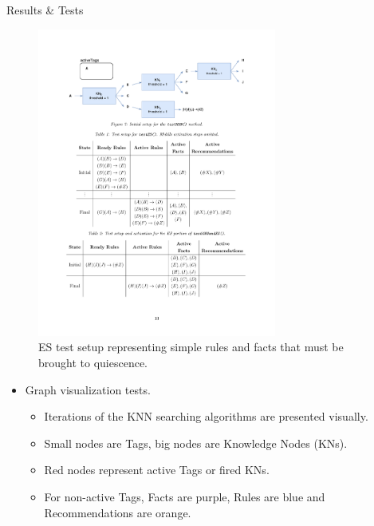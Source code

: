 \documentclass[final]{beamer} %
\begin{document}
\begin{frame}
\begin{columns}
\begin{column}{.33\textwidth}
{\begin{block}{Results \& Tests}
					\begin{figure}[!htb]
						\centering
						\includegraphics[width=0.7\textwidth]{figures/testES.pdf}
						\caption
						{ES test setup representing simple rules and facts that must be brought to quiescence.}
					\end{figure}
					
					\begin{itemize}
						\item Graph visualization tests.
						\begin{itemize}
							\item Iterations of the KNN searching algorithms are presented visually.
							\item Small nodes are Tags, big nodes are Knowledge Nodes (KNs).
							\item Red nodes represent active Tags or fired KNs. 
							\item For non-active Tags, Facts are purple, Rules are blue and Recommendations are orange.
						\end{itemize}
					\end{itemize}
					

\end{block}}
\end{column}
\end{columns}
\end{frame}
\end{document}
